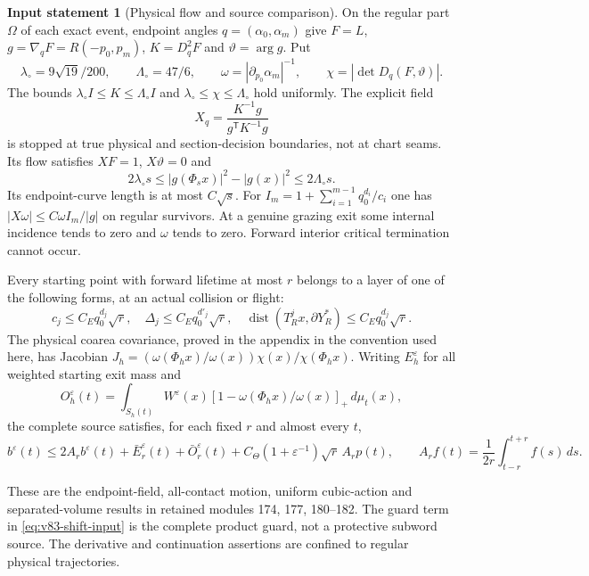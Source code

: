 \documentclass[11pt,reqno]{amsart}
\numberwithin{equation}{section}
\theoremstyle{definition}\newtheorem{definition}[theorem]{Definition}
\theoremstyle{remark}\newtheorem{remark}[theorem]{Remark}
\theoremstyle{definition}\newtheorem{inputstatement}[theorem]{Input statement}
\begin{document}
\begin{inputstatement}[Physical flow and source comparison]
\label{input:v83-geometric}
On the regular part $\Omega$ of each exact event, endpoint angles
$q=(\alpha_0,\alpha_m)$ give $F=L$, $g=\nabla_qF=R(-p_0,p_m)$,
$K=D_q^2F$ and $\vartheta=\arg g$. Put
\[
 \lambda_\circ=9\sqrt{19}/200,\qquad \Lambda_\circ=47/6,\qquad
 \omega=|\partial_{p_0}\alpha_m|^{-1},\qquad
 \chi=|\det D_q(F,\vartheta)|.
\]
The bounds $\lambda_\circ I\le K\le\Lambda_\circ I$ and
$\lambda_\circ\le\chi\le\Lambda_\circ$ hold uniformly.
The explicit field
\[
 X_q=\frac{K^{-1}g}{g^{\mathsf T}K^{-1}g}
\]
is stopped at true physical and section-decision boundaries, not at
chart seams. Its flow satisfies $XF=1$, $X\vartheta=0$ and
\begin{equation}\label{eq:v83-radial-input}
 2\lambda_\circ s\le |g(\Phi_sx)|^2-|g(x)|^2
                                      \le2\Lambda_\circ s.
\end{equation}
Its endpoint-curve length is at most $C\sqrt s$. For
$I_m=1+\sum_{i=1}^{m-1}q_0^{d_i}/c_i$ one has
$|X\omega|\le C\omega I_m/|g|$ on regular survivors. At a genuine
grazing exit some internal incidence tends to zero and $\omega$ tends
to zero. Forward interior critical termination cannot occur.

Every starting point with forward lifetime at most $r$ belongs to a
layer of one of the following forms, at an actual collision or flight:
\begin{equation}\label{eq:v83-layer-input}
 c_j\le C_Eq_0^{d_j}\sqrt r,\quad
 \Delta_j\le C_Eq_0^{d'_j}\sqrt r,\quad
 \operatorname{dist}(T_R^jx,\partial Y_R^*)\le C_Eq_0^{d_j}\sqrt r.
\end{equation}
The physical coarea covariance, proved in the appendix in the convention
used here, has Jacobian $J_h=(\omega(\Phi_hx)/\omega(x))\chi(x)/\chi(\Phi_hx)$.
Writing $E_h^\varepsilon$ for all weighted starting exit mass and
\[
 O_h^\varepsilon(t)=\int_{S_h(t)} W^\varepsilon(x)
            [1-\omega(\Phi_hx)/\omega(x)]_+\,d\mu_t(x),
\]
the complete source satisfies, for each fixed $r$ and almost every $t$,
\begin{equation}\label{eq:v83-shift-input}
 b^\varepsilon(t)\le2A_rb^\varepsilon(t)+\bar E_r^\varepsilon(t)
       +\bar O_r^\varepsilon(t)
       +C_\Theta(1+\varepsilon^{-1})\sqrt r\,A_rp(t),
 \qquad A_rf(t)=\frac1{2r}\int_{t-r}^{t+r}f(s)\,ds.
\end{equation}
\end{inputstatement}
These are the endpoint-field, all-contact motion, uniform cubic-action
and separated-volume results in retained modules 174, 177, 180--182.
The guard term in \eqref{eq:v83-shift-input} is the complete product
guard, not a protective subword source. The derivative and continuation
assertions are confined to regular physical trajectories.
\end{document}
